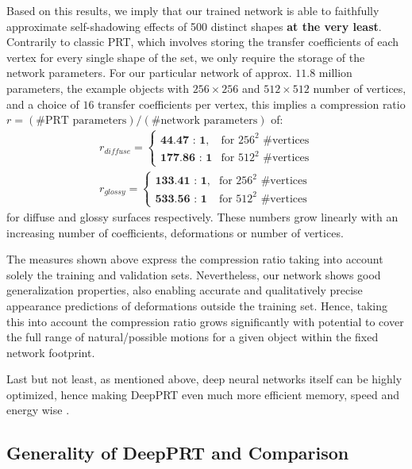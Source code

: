 Based on this results, we imply that our trained network is able to faithfully approximate self-shadowing effects of 500 distinct shapes \textbf{at the very least}. Contrarily to classic PRT, which involves storing the transfer coefficients of each vertex for every single shape of the set, we only require the storage of the network parameters.
For our particular network of approx. $11.8$ million parameters,  the example objects with $256 \times 256$ and $512 \times 512$ number of vertices, and  a choice of $16$ transfer coefficients per vertex, this implies a compression ratio $r = (\text{\# PRT parameters})/(\text{\# network parameters})$ of: 
\begin{align*}
r_{diffuse} = 
\begin{cases}
\textbf{44.47 : 1} , & \mbox{for } 256^2 \mbox{ \#vertices} \\
\textbf{177.86 : 1} & \mbox{for } 512^2 \mbox{ \#vertices}
\end{cases}
\\
r_{glossy} = 
\begin{cases}
\textbf{133.41 : 1} , & \mbox{for } 256^2 \mbox{ \#vertices} \\
\textbf{533.56 : 1} & \mbox{for } 512^2 \mbox{ \#vertices}
\end{cases}
\end{align*}
for diffuse and glossy surfaces respectively. These numbers grow linearly with an increasing number of coefficients, deformations or number of vertices. 

The measures shown above express the compression ratio taking into account solely the training and validation sets. Nevertheless, our network shows good generalization properties, also enabling accurate and qualitatively precise appearance predictions of deformations outside the training set. Hence, taking this into account the compression ratio grows significantly with potential to cover the full range of natural/possible motions for a given object within the fixed network footprint.

Last but not least, as mentioned above, deep neural networks itself can be highly optimized, hence making DeepPRT even much more efficient memory, speed and energy wise \cite{Survey_NN_Compression}. 
\subsection*{Generality of DeepPRT and Comparison}
